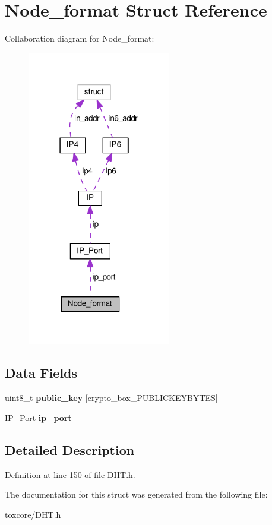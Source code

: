 \hypertarget{struct_node__format}{\section{Node\+\_\+format Struct Reference}
\label{struct_node__format}
}


Collaboration diagram for Node\+\_\+format\+:
\nopagebreak
\begin{figure}[H]
\begin{center}
\leavevmode
\includegraphics[width=178pt]{struct_node__format__coll__graph}
\end{center}
\end{figure}
\subsection*{Data Fields}
\begin{DoxyCompactItemize}
\item 
\hypertarget{struct_node__format_aaa806bb1136fb3d4b5d8d8970b596ff7}{uint8\+\_\+t {\bfseries public\+\_\+key} \mbox{[}crypto\+\_\+box\+\_\+\+P\+U\+B\+L\+I\+C\+K\+E\+Y\+B\+Y\+T\+E\+S\mbox{]}}\label{struct_node__format_aaa806bb1136fb3d4b5d8d8970b596ff7}

\item 
\hypertarget{struct_node__format_a86e2a5a56c0dd22df6e8b8a10e40f9e4}{\hyperlink{struct_i_p___port}{I\+P\+\_\+\+Port} {\bfseries ip\+\_\+port}}\label{struct_node__format_a86e2a5a56c0dd22df6e8b8a10e40f9e4}

\end{DoxyCompactItemize}


\subsection{Detailed Description}


Definition at line 150 of file D\+H\+T.\+h.



The documentation for this struct was generated from the following file\+:\begin{DoxyCompactItemize}
\item 
toxcore/D\+H\+T.\+h\end{DoxyCompactItemize}
